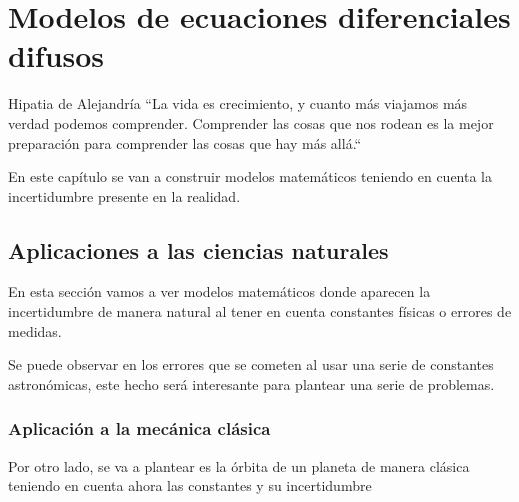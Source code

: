 
\chapter{Modelos de ecuaciones diferenciales difusos}
\begin{chapquote}{Hipatia de Alejandría}
	``La vida es crecimiento, y cuanto más viajamos más verdad podemos comprender. Comprender las cosas que nos rodean es la mejor preparación para comprender las cosas que hay más allá.``
\end{chapquote}
En este capítulo se van a construir modelos matemáticos teniendo en cuenta la incertidumbre presente en la realidad.
\section{Aplicaciones a las ciencias naturales}

En esta sección vamos a ver modelos matemáticos donde aparecen la incertidumbre de manera natural al tener en cuenta constantes físicas o errores de medidas. 

Se puede observar en \cite{nasa} los errores que se cometen al usar una serie de constantes astronómicas, este hecho será interesante para plantear una serie de problemas.
\subsection{Aplicación a la mecánica clásica}
Por otro lado, se va a plantear es la órbita de un planeta de manera clásica teniendo en cuenta ahora las constantes y su incertidumbre

